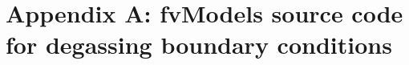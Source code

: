 \documentclass[11pt,a4paper]{article}
\begin{document}



\clearpage


\appendix
\section{Appendix A: fvModels source code for degassing boundary conditions}
\label{app:A}



\cleardoublepage
\end{document}
